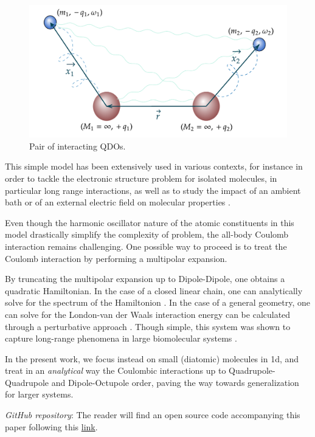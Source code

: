\documentclass[reprint, amsmath, amssymb, aps, prl]{revtex4-2}
\begin{document}
    \begin{figure}[h!]
    \centering
        \includegraphics[scale=0.49]{QDOs}
        \caption{\label{fig:epsart} Pair of interacting QDOs.}
    \end{figure}

    This simple model has been extensively used in various contexts, for instance in order to tackle the electronic structure problem for isolated molecules, in particular long range interactions, as well as to study the impact of an ambient bath or of an external electric field on molecular properties \cite{Karimpour_2022}.

    Even though the harmonic oscillator nature of the atomic constituents in this model drastically simplify the complexity of problem, the all-body Coulomb interaction remains challenging. One possible way to proceed is to treat the Coulomb interaction by performing a multipolar expansion.

    By truncating the multipolar expansion up to Dipole-Dipole, one obtains a quadratic Hamiltonian. In the case of a closed linear chain, one can analytically solve for the spectrum of the Hamiltonion \cite{doi:10.1063/1.1743992}. In the case of a general geometry, one can solve for the London-van der Waals interaction energy can be calculated through a perturbative approach \cite{doi:10.1063/1.1743991}. Though simple, this system was shown to capture long-range phenomena in large biomolecular systems \cite{https://doi.org/10.48550/arxiv.2205.11549}.

    In the present work, we focus instead on small (diatomic) molecules in 1d, and treat in an \textit{analytical} way the Coulombic interactions up to Quadrupole-Quadrupole and Dipole-Octupole order, paving the way towards generalization for larger systems.

    \textit{GitHub repository}: The reader will find an open source code accompanying this paper following this \href{https://github.com/MatthieuSarkis/Quartic-Potential}{link}.
\end{document}

